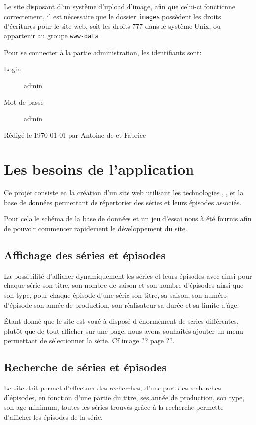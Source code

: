 \documentclass[12pt,a4paper,openany]{book}
\let\pagebreakORIG\pagebreak
\let\clearpageORIG\clearpage
\let\cleardoublepageORIG\cleardoublepage
\newcommand{\restorepagebreak}{\renewcommand{\pagebreak}{\pagebreakORIG}\renewcommand{\clearpage}{\clearpageORIG}\renewcommand{\cleardoublepage}{\cleardoublepageORIG}}
\begin{document}
	Le site disposant d'un système d'upload d'image, afin que celui-ci fonctionne correctement, il est nécessaire que le dossier \texttt{images} possèdent les
	droits d'écritures pour le site web, soit les droits 777 dans le système Unix, ou appartenir au groupe \texttt{www-data}.

	Pour se connecter à la partie administration, les identifiants sont:
	\begin{description}
		\item[Login] admin
		\item[Mot de passe] admin
	\end{description}
	\vfill
	\footnotesize Rédigé le \today{} par Antoine de  et Fabrice 
	\restorepagebreak
	\tableofcontents
	\chapter{Les besoins de l'application}
	Ce projet consiste en la création d'un site web utilisant les technologies , ,  et la base de données  permettant
	de répertorier des séries et leurs épisodes associés.  

	Pour cela le schéma de la base de données et un jeu d'essai nous à été fournis afin de pouvoir commencer rapidement le développement du site.
	\section{Affichage des séries et épisodes}
	La possibilité d'afficher dynamiquement les séries et leurs épisodes avec ainsi pour chaque série son titre, son nombre de saison et son nombre
	d'épisodes ainsi que son type, pour chaque épisode d'une série  son titre, sa saison, son numéro d'épisode son année de production, son réalisateur sa
	durée  et sa limite d'âge.

	Étant donné que le site est voué à disposé d énormément de séries différentes, plutôt que de tout afficher sur une page, nous avons souhaités ajouter un
	menu permettant de sélectionner la série. Cf image ?? page ??. %
	\section{Recherche de séries et épisodes}
	Le site doit permet d'effectuer des recherches, d'une part des recherches d'épisodes, en fonction d'une partie du titre, ses année de production, son type,
	son age minimum, toutes les séries trouvés grâce à la recherche permette d'afficher les épisodes de la série.
\end{document}
